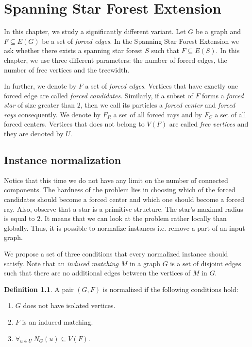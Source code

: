 \documentclass[en]{pracamgr}
\theoremstyle{definition}
\newtheorem{definition}{Definition}
\newcommand{\ssf}{spanning star forest}
\newcommand{\ssfep}{{\sc Spanning Star Forest Extension}}
\begin{document}
\chapter{Spanning Star Forest Extension}\label{sec5}

In this chapter, we study a significantly different variant. Let $G$ be a graph and $F \subseteq E(G)$ be a set of \emph{forced edges}. In the \ssfep{} we ask whether there exists a \ssf{} $S$ such that $F \subseteq E(S)$. In this chapter, we use three different parameters: the number of forced edges, the number of free vertices and the treewidth. 

In further, we denote by $F$ a set of \emph{forced edges}. Vertices that have exactly one forced edge are called \emph{forced candidates}. Similarly, if a subset of $F$ forms a \emph{forced star} of size greater than $2$, then we call its particles a \emph{forced center} and \emph{forced rays} consequently. We denote by $F_R$ a set of all forced rays and by $F_C$ a set of all forced centers. Vertices that does not belong to $V(F)$ are called \emph{free vertices} and they are denoted by $U$.

\section{Instance normalization} 

Notice that this time we do not have any limit on the number of connected components. The hardness of the problem lies in choosing which of the forced candidates should become a forced center and which one should become a forced ray. Also, observe that a star is a primitive structure. The star's maximal radius is equal to $2$. It means that we can look at the problem rather locally than globally. Thus, it is possible to normalize instances i.e. remove a part of an input graph.

We propose a set of three conditions that every normalized instance should satisfy. Note that an \emph{induced matching} $M$ in a graph $G$ is a set of disjoint edges such that there are no additional edges between the vertices of $M$ in $G$.

\begin{definition}\label{norm-ssfe}
	A pair $(G,F)$ is normalized if the following conditions hold:
	\begin{enumerate}
		\item $G$ does not have isolated vertices.
		\item $F$ is an induced matching.
		\item $\forall_{u \in U}\ N_G(u) \subseteq V(F)$.
	\end{enumerate}
\end{definition}
\end{document}
